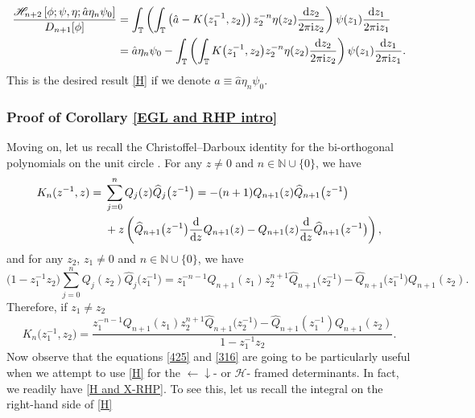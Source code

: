 \documentclass[pdftex]{sigma}
\numberwithin{equation}{section}
\newcommand{\N}{{\mathbb N}}
\newcommand{\T}{{\mathbb T}}
\newcommand{\ii}{{\rm i}}
\newcommand{\dd}{{\rm d}}
\begin{document}
		\begin{equation*}
			\begin{split}
				\frac{\mathscr{H}_{n+2}\left[\phi; \psi, \eta ;\hat{a} \eta_n \psi_{0}\right]}{D_{n+1}[\phi]} & = \int_{\T} \left(\int_{\T} \left(\hat{a}-K\big(z^{-1}_1,z_2\big) \right) z^{-n}_2 \eta(z_2) \frac{\dd z_2}{2 \pi \ii z_2} \right) \psi(z_1) \frac{\dd z_1}{2 \pi \ii z_1} \\
 & = \hat{a} \eta_n \psi_{0} - \int_{\T} \left(\int_{\T} K\big(z^{-1}_1,z_2\big) z^{-n}_2 \eta(z_2) \frac{\dd z_2}{2 \pi \ii z_2} \right) \psi(z_1) \frac{\dd z_1}{2 \pi \ii z_1}.
			\end{split}
		\end{equation*}
		This is the desired result \eqref{H} if we denote $a \equiv \hat{a} \eta_n \psi_{0}$.
		\subsubsection{Proof of Corollary \ref{EGL and RHP intro}}			
		Moving on, let us recall the Christoffel--Darboux identity for the bi-orthogonal polynomials on the unit circle \cite{DIK,SzegoOP}. For any $z \neq 0$ and $n \in \N \cup \{0\}$, we have
		\begin{align}
				K_{n}(z^{-1},z) ={}& \sum_{j=0}^{n} Q_{j}(z)\widehat{Q}_{j}\big(z^{-1}\big) = -(n+1) Q_{n+1}(z)\widehat{Q}_{n+1}\big(z^{-1}\big) \nonumber\\
 & + z \left( \widehat{Q}_{n+1}\big(z^{-1}\big) \frac{\dd}{\dd z} Q_{n+1}(z) - Q_{n+1}(z) \frac{\dd}{\dd z} \widehat{Q}_{n+1}\big(z^{-1}\big) \right),\label{425}
		\end{align}		
and for any $z_2$, $z_1 \neq 0$ and $n \in \N \cup \{0\}$, we have
		\begin{equation*}
			\big(1-z^{-1}_1z_2\big) \sum_{j=0}^{n} Q_{j}(z_2)\widehat{Q}_{j}\big(z^{-1}_1\big) = z_1^{-n-1}Q_{n+1}(z_1)z_2^{n+1}\widehat{Q}_{n+1}\big(z_2^{-1}\big) - \widehat{Q}_{n+1}\big(z^{-1}_1\big) Q_{n+1}(z_2).
		\end{equation*}
		Therefore, if $z_1 \neq z_2$
		\begin{equation}\label{316}
			K_{n}\big(z^{-1}_1,z_2\big) = \frac{z_1^{-n-1}Q_{n+1}(z_1)z_2^{n+1}\widehat{Q}_{n+1}\big(z_2^{-1}\big) - \widehat{Q}_{n+1}(z_1^{-1}) Q_{n+1}(z_2)}{1-z^{-1}_1z_2}.
		\end{equation}
		Now observe that the equations \eqref{425} and \eqref{316} are going to be particularly useful when we attempt to use \eqref{H} for the $\leftarrow \downarrow $- or $\mathscr{H}$- framed determinants. In fact, we readily have \eqref{H and X-RHP}. To see this, let us recall the integral on the right-hand side of \eqref{H}
\end{document}

